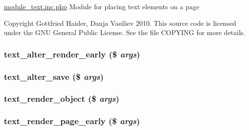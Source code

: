 \hyperlink{module__text_8inc_8php}{module\_\-text.inc.php} Module for placing text elements on a page

Copyright Gottfried Haider, Danja Vasiliev 2010. This source code is licensed under the GNU General Public License. See the file COPYING for more details. \hypertarget{module__text_8inc_8php_c57835ba072c7df9367b2c277d2f5bd7}{
\subsubsection[{text\_\-alter\_\-render\_\-early}]{\setlength{\rightskip}{0pt plus 5cm}text\_\-alter\_\-render\_\-early (\$ {\em args})}}
\label{module__text_8inc_8php_c57835ba072c7df9367b2c277d2f5bd7}


\hypertarget{module__text_8inc_8php_aee0a89ba2b213f761b05ca2d6460910}{
\subsubsection[{text\_\-alter\_\-save}]{\setlength{\rightskip}{0pt plus 5cm}text\_\-alter\_\-save (\$ {\em args})}}
\label{module__text_8inc_8php_aee0a89ba2b213f761b05ca2d6460910}


\hypertarget{module__text_8inc_8php_8e9b1db22ff6cb0f3d20815da6aae6ce}{
\subsubsection[{text\_\-render\_\-object}]{\setlength{\rightskip}{0pt plus 5cm}text\_\-render\_\-object (\$ {\em args})}}
\label{module__text_8inc_8php_8e9b1db22ff6cb0f3d20815da6aae6ce}


\hypertarget{module__text_8inc_8php_aaa8b8407d795f6dba9d258f1457ade8}{
\subsubsection[{text\_\-render\_\-page\_\-early}]{\setlength{\rightskip}{0pt plus 5cm}text\_\-render\_\-page\_\-early (\$ {\em args})}}
\label{module__text_8inc_8php_aaa8b8407d795f6dba9d258f1457ade8}


